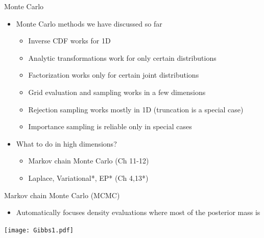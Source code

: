 \documentclass[finnish,english,t]{beamer}
\begin{document}
\begin{frame}{Monte Carlo}

  \vspace{-0.5\baselineskip}
  \begin{itemize}
  \item<1-> Monte Carlo methods we have discussed so far
    \begin{itemize}
    \item Inverse CDF works for 1D
    \item Analytic transformations work for only certain distributions
    \item Factorization works only for certain joint distributions
    \item Grid evaluation and sampling works in a few dimensions
    \item Rejection sampling works mostly in 1D (truncation is a special case)
    \item Importance sampling is reliable only in special cases
    \end{itemize}
  \item<3-> What to do in high dimensions?
    \begin{itemize}
    \item Markov chain Monte Carlo (Ch 11-12)
    \item Laplace, Variational*, EP* (Ch 4,13*)
    \end{itemize}
  \end{itemize}
\end{frame}

\begin{frame}{Markov chain Monte Carlo (MCMC)}

  \begin{itemize}
  \item Automatically focuses density evaluations where most of the
    posterior mass is
  \end{itemize}
    \texttt{[image: Gibbs1.pdf]}
  

\end{frame}
\end{document}
